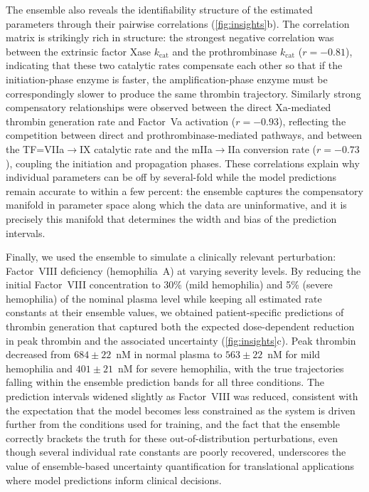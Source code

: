 \documentclass[preprint,review,12pt]{elsarticle}
\begin{document}
The ensemble also reveals the identifiability structure of the estimated parameters through their pairwise correlations (\cref{fig:insights}b).
The correlation matrix is strikingly rich in structure: the strongest negative correlation was between the extrinsic factor Xase $k_{\text{cat}}$ and the prothrombinase $k_{\text{cat}}$ ($r = -0.81$), indicating that these two catalytic rates compensate each other so that if the initiation-phase enzyme is faster, the amplification-phase enzyme must be correspondingly slower to produce the same thrombin trajectory.
Similarly strong compensatory relationships were observed between the direct Xa-mediated thrombin generation rate and Factor~Va activation ($r = -0.93$), reflecting the competition between direct and prothrombinase-mediated pathways, and between the TF=VIIa$\to$IX catalytic rate and the mIIa$\to$IIa conversion rate ($r = -0.73$), coupling the initiation and propagation phases.
These correlations explain why individual parameters can be off by several-fold while the model predictions remain accurate to within a few percent: the ensemble captures the compensatory manifold in parameter space along which the data are uninformative, and it is precisely this manifold that determines the width and bias of the prediction intervals.

Finally, we used the ensemble to simulate a clinically relevant perturbation: Factor~VIII deficiency (hemophilia~A) at varying severity levels.
By reducing the initial Factor~VIII concentration to 30\% (mild hemophilia) and 5\% (severe hemophilia) of the nominal plasma level while keeping all estimated rate constants at their ensemble values, we obtained patient-specific predictions of thrombin generation that captured both the expected dose-dependent reduction in peak thrombin and the associated uncertainty (\cref{fig:insights}c).
Peak thrombin decreased from $684 \pm 22$~nM in normal plasma to $563 \pm 22$~nM for mild hemophilia and $401 \pm 21$~nM for severe hemophilia, with the true trajectories falling within the ensemble prediction bands for all three conditions.
The prediction intervals widened slightly as Factor~VIII was reduced, consistent with the expectation that the model becomes less constrained as the system is driven further from the conditions used for training, and the fact that the ensemble correctly brackets the truth for these out-of-distribution perturbations, even though several individual rate constants are poorly recovered, underscores the value of ensemble-based uncertainty quantification for translational applications where model predictions inform clinical decisions.
\end{document}
